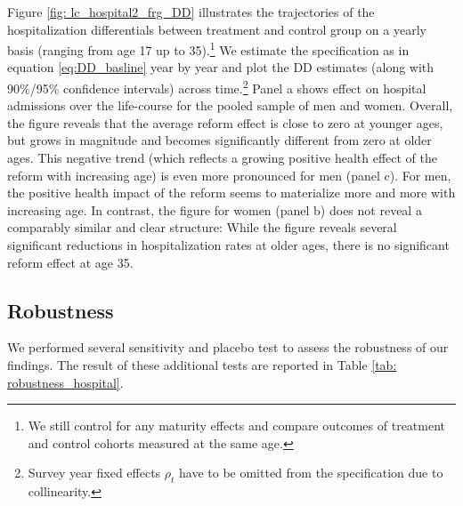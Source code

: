 \documentclass[11pt, a4paper]{article} %
\begin{document}
Figure \ref{fig: lc_hospital2_frg_DD} illustrates the trajectories of the hospitalization differentials between treatment and control group on a yearly basis (ranging from age 17 up to 35).\footnote{We still control for any maturity effects and compare outcomes of treatment and control cohorts measured at the same age.} We estimate the specification as in equation \ref{eq:DD_basline} year by year and plot the DD estimates (along with 90\%/95\% confidence intervals) across time.\footnote{Survey year fixed effects $\rho_t$ have to be omitted from the specification due to collinearity.} Panel a shows effect on hospital admissions over the life-course for the pooled sample of men and women. Overall, the figure reveals that the average reform effect is close to zero at younger ages, but grows in magnitude and becomes significantly different from zero at older ages. This negative trend (which reflects a growing positive health effect of the reform with increasing age) is even more pronounced for men (panel c). For men, the positive health impact of the reform seems to  materialize more and more with increasing age. In contrast, the figure for women (panel b) does not reveal a comparably similar and clear structure: While the figure reveals several significant reductions in hospitalization rates at older ages, there is no significant reform effect at age 35.\newline

\subsection{Robustness}\label{sec: robustness}

We performed several sensitivity and placebo test to assess the robustness of our findings. The result of these additional tests are reported in Table \ref{tab: robustness_hospital}. 
\end{document}

